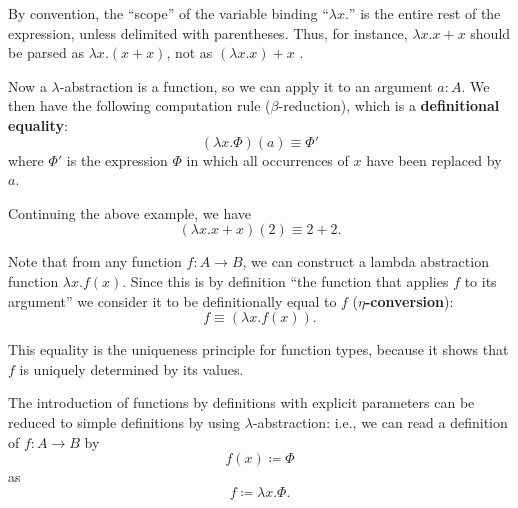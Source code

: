 By convention, the ``scope'' of the variable binding ``$\lambda x.$'' is the entire rest of the expression, unless delimited with parentheses. Thus, for instance, $\lambda x. x + x$ should be parsed as $\lambda x.(x + x)$, not as $(\lambda x. x) + x$ .


Now a $\lambda$-abstraction is a function, so we can apply it to an argument $a : A$. We then have the following computation rule ($\beta$-reduction), which is a \textbf{definitional equality}:
$$ (\lambda x. \Phi)(a) \equiv \Phi' $$
where $\Phi'$ is the expression $\Phi$ in which all occurrences of $x$ have been replaced by $a$.
\begin{example}
  Continuing the above example, we have
  $$ (\lambda x. x + x)(2) \equiv 2 + 2. $$
\end{example}

Note that from any function $f : A \to B$, we can construct a lambda abstraction function $\lambda x. f(x)$.
Since this is by definition ``the function that applies $f$ to its argument'' we consider it to be definitionally
equal to $f$ (\textbf{$\eta$-conversion}):
$$ f \equiv (\lambda x. f(x)). $$

This equality is the uniqueness principle for function types, because it shows that $f$ is uniquely determined by its values.

The introduction of functions by definitions with explicit parameters can be reduced to simple definitions by using $\lambda$-abstraction: i.e., we can read a definition of $f : A \to B$ by
$$ f(x) \coloneqq \Phi
$$
as
$$ f \coloneqq \lambda x. \Phi. $$



